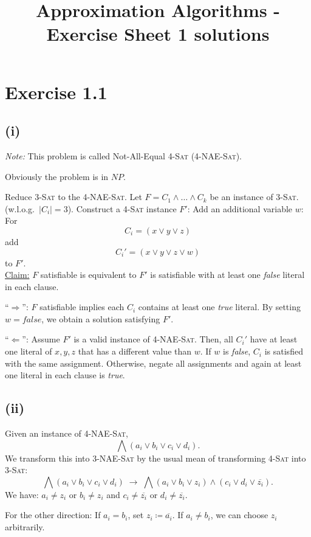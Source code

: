\documentclass[oneside,a4paper]{amsart}
\newcommand{\NP}{\ensuremath{N \! P}}
\begin{document}
\title{Approximation Algorithms - Exercise Sheet 1 solutions}
\maketitle{}
\section*{Exercise 1.1}
\subsection*{(i)}
\textit{Note:} This problem is called Not-All-Equal \textsc{4-Sat} (\textsc{4-NAE-Sat}).

Obviously the problem is in \NP.

Reduce \textsc{3-Sat} to the \textsc{4-NAE-Sat}.
Let $F = C_1 \wedge \ldots \wedge C_k$ be an instance of \textsc{3-Sat}.
(w.l.o.g.\ $|C_i| = 3$).
Construct a \textsc{4-Sat} instance $F'$: Add an additional variable $w$: For
\[
	C_i = (x \vee y \vee z)
\]
add
\[
	C_i' = (x \vee y \vee z \vee w)
\]
to $F'$. \\
\underline{Claim:} $F$ satisfiable is equivalent to $F'$ is satisfiable with at least one \textit{false} literal in each clause.

``$\Rightarrow$'': $F$ satisfiable implies each $C_i$ contains at least one \textit{true} literal. By setting $w = \textit{false}$, we obtain a solution satisfying $F'$.

``$\Leftarrow$'': Assume $F'$ is a valid instance of \textsc{4-NAE-Sat}. Then, all $C_i'$ have at least one literal of $x, y, z$ that has a different value than $w$.
If $w$ is \textit{false}, $C_i$ is satisfied with the same assignment. Otherwise, negate all assignments and again at least one literal in each clause is \textit{true}.
\subsection*{(ii)}
Given an instance of \textsc{4-NAE-Sat},
\[
	\bigwedge (a_i \vee b_i \vee c_i \vee d_i).
\]
We transform this into \textsc{3-NAE-Sat} by the usual mean of transforming \textsc{4-Sat} into \textsc{3-Sat}:
\[
	\bigwedge (a_i \vee b_i \vee c_i \vee d_i) \; \to \; \bigwedge (a_i \vee b_i \vee z_i) \wedge (c_i \vee d_i \vee \overline{z_i}).
\]
We have: $a_i \neq z_i$ or $b_i \neq z_i$ and $c_i \neq \overline{z_i}$ or $d_i \neq \overline{z_i}$.

For the other direction: If $a_i = b_i$, set $z_i \coloneqq \overline{a_i}$. If $a_i \neq b_i$, we can choose $z_i$ arbitrarily.
\end{document}
